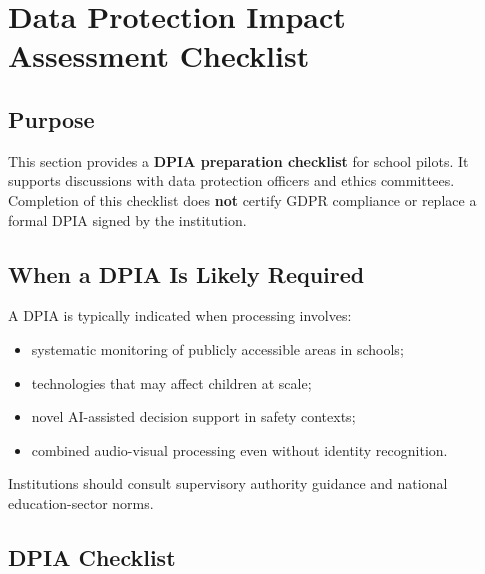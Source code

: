 \section{Data Protection Impact Assessment Checklist}
\label{sec:dpia}

\subsection{Purpose}

This section provides a \textbf{DPIA preparation checklist} for school pilots.
It supports discussions with data protection officers and ethics committees.
Completion of this checklist does \textbf{not} certify GDPR compliance or replace a
formal DPIA signed by the institution.

\subsection{When a DPIA Is Likely Required}

A DPIA is typically indicated when processing involves:
\begin{itemize}[noitemsep]
  \item systematic monitoring of publicly accessible areas in schools;
  \item technologies that may affect children at scale;
  \item novel AI-assisted decision support in safety contexts;
  \item combined audio-visual processing even without identity recognition.
\end{itemize}

Institutions should consult supervisory authority guidance and national education-sector norms.

\subsection{DPIA Checklist}

